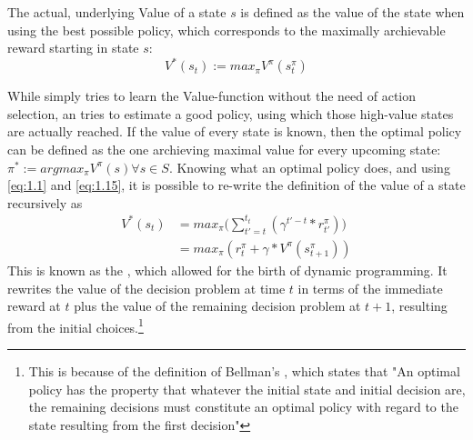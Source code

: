 The actual, underlying Value of a state $s$ is defined as the value of the state when using the best possible policy, which corresponds to the maximally archievable reward starting in state $s$:
\begin{equation} \label{eq:1.15}
	V^*(s_t) := max_\pi V^\pi(s_t^\pi)
\end{equation}

While  simply tries to learn the Value-function without the need of action selection, an  tries to estimate a good policy, using which those high-value states are actually reached. If the value of every state is known, then the optimal policy can be defined as the one archieving maximal value for every upcoming state: \mbox{$\pi^* := argmax_\pi V^\pi(s) \forall s \in S$}. Knowing what an optimal policy does, and using \ref{eq:1.1} and \ref{eq:1.15}, it is possible to re-write the definition of the value of a state recursively as 
\begin{align}
	V^*(s_t) &= max_\pi \Big(\sum_{t'=t}^{t_t} ( \gamma^{t'-t} * r^\pi_{t'} )\Big) \label{eq:1.16}\\
	         &= max_\pi (r^\pi_t + \gamma * V^\pi(s_{t+1}^\pi)) \label{bellman}
\end{align}
This is known as the , which allowed for the birth of dynamic programming. It rewrites the value of the decision problem at time $t$ in terms of the immediate reward at $t$ plus the value of the remaining decision problem at $t+1$, resulting from the initial choices.\footnote{This is because of the definition of Bellman's , which states that "An optimal policy has the property that whatever the initial state and initial decision are, the remaining decisions must constitute an optimal policy with regard to the state resulting from the first decision\cite{Bellman1957}"}

